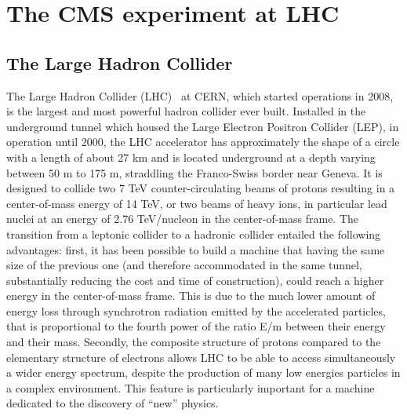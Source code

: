 \chapter{The CMS experiment at LHC}
\label{cap2}
\section{The Large Hadron Collider}
The Large Hadron Collider (LHC)~\cite{Pettersson:291782}  at CERN,
which started operations in 2008, is the largest and most powerful hadron collider ever built. Installed in the
underground tunnel which housed the Large Electron Positron Collider (LEP),
in operation until 2000, the LHC accelerator
has approximately the shape of a circle with a length of about 27 km
and is located underground at a depth varying
between 50 m to 175 m, straddling the Franco-Swiss border near Geneva. It is designed
to collide two 7 TeV counter-circulating beams of protons resulting in a center-of-mass
energy of 14 TeV, or two beams of heavy ions, in particular lead nuclei at an energy of
2.76 TeV/nucleon in the center-of-mass frame.
The transition from a leptonic collider to a hadronic collider entailed the following
advantages: first, it has been possible to build a machine that having the same size of the
previous one (and therefore accommodated in the same tunnel,
substantially reducing the cost and time of construction), could reach
a higher energy in the center-of-mass
frame. This is due to the much lower amount of energy loss through synchrotron radiation
emitted by the accelerated particles, that is proportional to the fourth power of the ratio
E/m between their energy and their mass. Secondly, the composite structure of protons
compared to the elementary structure of electrons allows LHC to be able to access simultaneously a wider energy spectrum, despite the production of many low energies particles in a complex environment. This feature is particularly important for a machine dedicated
to the discovery of “new” physics.

